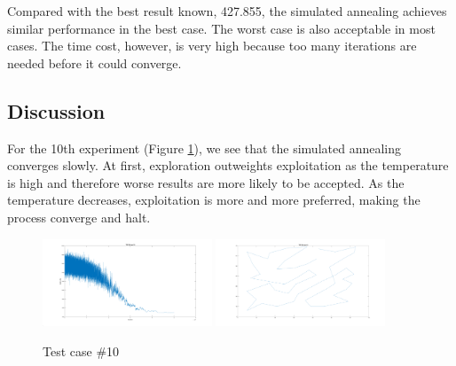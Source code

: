 \documentclass{IEEEtran}
\begin{document}
{{        Compared with the best result known, 427.855, the simulated annealing achieves similar performance in the best case.
        The worst case is also acceptable in most cases. 
        The time cost, however, is very high because too many iterations are needed before it could converge.
    }

    \subsection{Discussion}
    {
        For the 10th experiment (Figure \ref{fig:TSP_SA_example}), we see that the simulated annealing converges slowly. 
        At first, exploration outweights exploitation as the temperature is high and therefore worse results are more likely to be accepted.
        As the temperature decreases, exploitation is more and more preferred, making the process converge and halt.

        \begin{figure}[!htbp]
            \centering
            \includegraphics[width=0.45\textwidth]{Q2/figures/TSP_SA_test_result_10.png}
            \includegraphics[width=0.45\textwidth]{Q2/figures/TSP_SA_test_10.png}
            \caption{Test case \#10}
            \label{fig:TSP_SA_example}
        \end{figure}

}}
\end{document}
